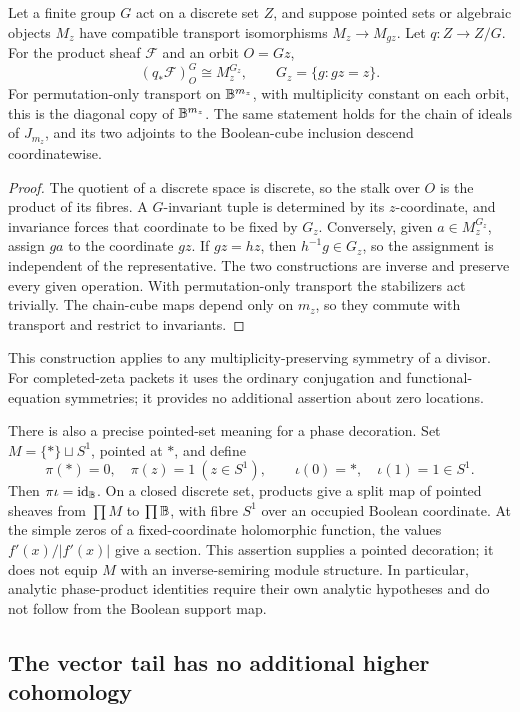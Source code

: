 \begin{proposition}\label{prop:packet-stabilizer}
Let a finite group $G$ act on a discrete set $Z$, and suppose pointed sets or algebraic objects $M_z$ have compatible transport isomorphisms $M_z\to M_{gz}$. Let $q:Z\to Z/G$. For the product sheaf $\mathcal F$ and an orbit $O=Gz$,
\[
 (q_*\mathcal F)^G_O\cong M_z^{G_z},
 \qquad G_z=\{g:gz=z\}.
\]
For permutation-only transport on $\mathbb B^{m_z}$, with multiplicity constant on each orbit, this is the diagonal copy of $\mathbb B^{m_z}$. The same statement holds for the chain of ideals of $J_{m_z}$, and its two adjoints to the Boolean-cube inclusion descend coordinatewise.
\end{proposition}
\begin{proof}
The quotient of a discrete space is discrete, so the stalk over $O$ is the product of its fibres. A $G$-invariant tuple is determined by its $z$-coordinate, and invariance forces that coordinate to be fixed by $G_z$. Conversely, given $a\in M_z^{G_z}$, assign $ga$ to the coordinate $gz$. If $gz=hz$, then $h^{-1}g\in G_z$, so the assignment is independent of the representative. The two constructions are inverse and preserve every given operation. With permutation-only transport the stabilizers act trivially. The chain-cube maps depend only on $m_z$, so they commute with transport and restrict to invariants.
\end{proof}

This construction applies to any multiplicity-preserving symmetry of a divisor. For completed-zeta packets it uses the ordinary conjugation and functional-equation symmetries; it provides no additional assertion about zero locations.

There is also a precise pointed-set meaning for a phase decoration. Set $M=\{*\}\sqcup S^1$, pointed at $*$, and define
\[
 \pi(*)=0,\quad \pi(z)=1\ (z\in S^1),\qquad
 \iota(0)=*,\quad \iota(1)=1\in S^1.
\]
Then $\pi\iota=\operatorname{id}_{\mathbb B}$. On a closed discrete set, products give a split map of pointed sheaves from $\prod M$ to $\prod\mathbb B$, with fibre $S^1$ over an occupied Boolean coordinate. At the simple zeros of a fixed-coordinate holomorphic function, the values $f'(x)/|f'(x)|$ give a section. This assertion supplies a pointed decoration; it does not equip $M$ with an inverse-semiring module structure. In particular, analytic phase-product identities require their own analytic hypotheses and do not follow from the Boolean support map.

\subsection{The vector tail has no additional higher cohomology}

